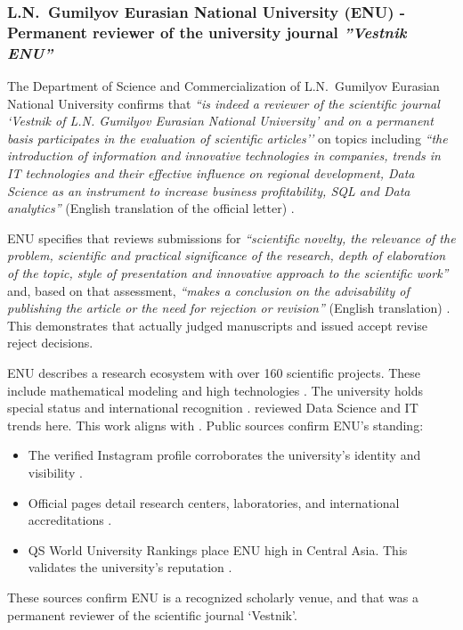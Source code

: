 \subsubsection{L.N.\ Gumilyov Eurasian National University (ENU) - Permanent reviewer of the university journal \emph{''Vestnik ENU''}}

\label{subsubsec:JudgingENU}

The Department of Science and Commercialization of L.N.\ Gumilyov Eurasian National University confirms that \mrl{} \emph{``is indeed a reviewer of the scientific journal `Vestnik of L.N. Gumilyov Eurasian National University’ and on a permanent basis participates in the evaluation of scientific articles''} on topics including \emph{``the introduction of information and innovative technologies in companies, trends in IT technologies and their effective influence on regional development, Data Science as an instrument to increase business profitability, SQL and Data analytics''} (English translation of the official letter) .

ENU specifies that \mrl{} reviews submissions for \emph{``scientific novelty, the relevance of the problem, scientific and practical significance of the research, depth of elaboration of the topic, style of presentation and innovative approach to the scientific work''} and, based on that assessment, \emph{``makes a conclusion on the advisability of publishing the article or the need for rejection or revision''} (English translation) . This demonstrates that \mrl{} actually judged manuscripts and issued accept revise reject decisions.

ENU describes a research ecosystem with over 160 scientific projects. These include mathematical modeling and high technologies . The university holds special status and international recognition . \mrl{} reviewed Data Science and IT trends here. This work aligns with \fie. Public sources confirm ENU’s standing:
\vspace{-0.5\baselineskip}
\begin{itemize}[nosep]
\item The verified Instagram profile corroborates the university’s identity and visibility .
\item Official pages detail research centers, laboratories, and international accreditations .
\item QS World University Rankings place ENU high in Central Asia. This validates the university’s reputation .
\end{itemize}
These sources confirm ENU is a recognized scholarly venue, and that\mrl{} was a permanent reviewer of the scientific journal `Vestnik'.


